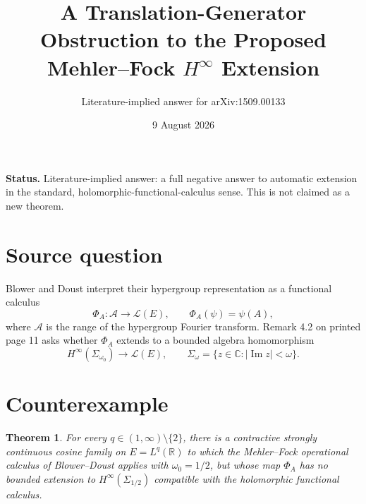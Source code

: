 \documentclass[11pt]{article}
\title{A Translation-Generator Obstruction to the Proposed\\
Mehler--Fock \texorpdfstring{$H^\infty$}{H-infinity} Extension}
\author{Literature-implied answer for arXiv:1509.00133}
\date{9 August 2026}
\newtheorem{theorem}{Theorem}
\newcommand{\R}{\mathbb R}
\newcommand{\Lop}{\mathcal L}
\newcommand{\Aalg}{\mathcal A}
\begin{document}
\maketitle

\noindent\textbf{Status.}
Literature-implied answer: a full negative answer to automatic extension in
the standard, holomorphic-functional-calculus sense.  This is not claimed as
a new theorem.

\section*{Source question}
Blower and Doust interpret their hypergroup representation as a functional
calculus
\[
 \Phi_A:\Aalg\longrightarrow\Lop(E),\qquad \Phi_A(\psi)=\psi(A),
\]
where \(\Aalg\) is the range of the hypergroup Fourier transform.  Remark
4.2 on printed page 11 asks whether \(\Phi_A\) extends to a bounded algebra
homomorphism
\[
 H^\infty(\Sigma_{\omega_0})\longrightarrow\Lop(E),
 \qquad \Sigma_\omega=\{z\in\mathbb C:|\operatorname{Im}z|<\omega\}.
\]

\section*{Counterexample}
\begin{theorem}
For every \(q\in(1,\infty)\setminus\{2\}\), there is a contractive strongly
continuous cosine family on \(E=L^q(\R)\) to which the Mehler--Fock
operational calculus of Blower--Doust applies with \(\omega_0=1/2\), but whose
map \(\Phi_A\) has no bounded extension to
\(H^\infty(\Sigma_{1/2})\) compatible with the holomorphic functional
calculus.
\end{theorem}
\end{document}
